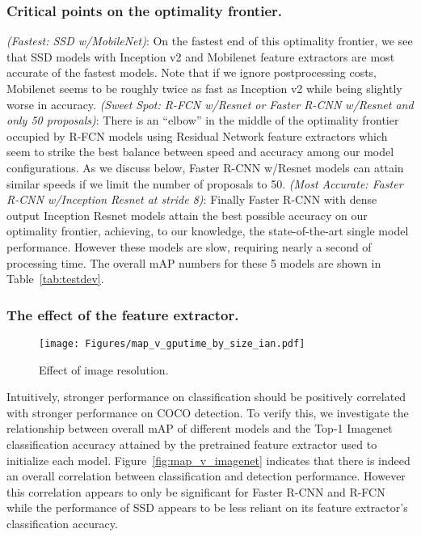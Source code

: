 \documentclass[10pt,twocolumn,letterpaper]{article}
\renewcommand{\paragraph}[1]{\subsubsection{#1}}
\begin{document}
\paragraph{Critical points on the optimality frontier.}


{\em (Fastest: SSD w/MobileNet)}:
On the fastest end of this optimality frontier, we see that SSD models with Inception v2 and Mobilenet feature extractors are most accurate of the fastest models.  Note that if we ignore postprocessing costs, Mobilenet seems to be roughly twice as fast as Inception v2 while being slightly worse in accuracy.
{\em (Sweet Spot: R-FCN  w/Resnet or Faster R-CNN w/Resnet and only 50 proposals)}:
There is an ``elbow'' in the middle of the optimality frontier occupied by 
R-FCN models using Residual Network feature extractors which seem to strike
the best balance between speed and accuracy among our model configurations.
As we discuss below, Faster R-CNN w/Resnet models can attain similar speeds if we limit the number of proposals to 50.
{\em (Most Accurate: Faster R-CNN w/Inception Resnet at stride 8)}:
Finally Faster R-CNN with dense output Inception Resnet models attain
the best possible accuracy on our optimality frontier, achieving, to
our knowledge, the state-of-the-art single model performance.  However
these models are slow, requiring nearly a second of processing time.
The overall mAP numbers for these 5 models are shown in
Table~\ref{tab:testdev}.





\paragraph{The effect of the feature extractor.}


\begin{figure*}[t]
\begin{center}
\texttt{[image: Figures/map\_v\_gputime\_by\_size\_ian.pdf]}
\caption{
  \footnotesize Effect of image resolution.
}\vspace{-5mm}
\label{fig:map_v_gputime_by_size}
\end{center}
\end{figure*}

Intuitively, stronger performance on classification should be
positively correlated with stronger performance on COCO detection.   
To verify this, we investigate the relationship between overall mAP of different models and the Top-1 Imagenet classification accuracy attained by
the pretrained feature extractor used to initialize each model.
Figure~\ref{fig:map_v_imagenet} indicates that there is indeed an overall correlation between classification and detection performance.
However this correlation appears to  only be significant for Faster R-CNN and R-FCN while the performance of SSD appears to be less reliant on
its feature extractor's classification accuracy.  
\end{document}
